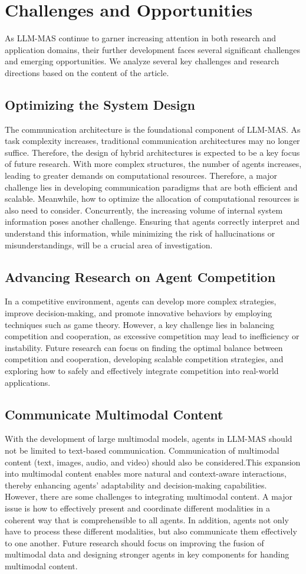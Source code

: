 \section{Challenges and Opportunities}
As LLM-MAS continue to garner increasing attention in both research and application domains, their further development faces several significant challenges and emerging opportunities. We analyze several key challenges and research directions based on the content of the article.
\subsection{Optimizing the System Design}
The communication architecture is the foundational component of LLM-MAS. As task complexity increases, traditional communication architectures may no longer suffice. Therefore, the design of hybrid architectures is expected to be a key focus of future research. With more complex structures, the number of agents increases, leading to greater demands on computational resources. Therefore, a major challenge lies in developing communication paradigms that are both efficient and scalable. Meanwhile, how to optimize the allocation of computational resources is also need to consider. Concurrently, the increasing volume of internal system information poses another challenge. Ensuring that agents correctly interpret and understand this information, while minimizing the risk of hallucinations or misunderstandings, will be a crucial area of investigation.
\subsection{Advancing Research on Agent Competition}
In a competitive environment, agents can develop more complex strategies, improve decision-making, and promote innovative behaviors by employing techniques such as game theory. However, a key challenge lies in balancing competition and cooperation, as excessive competition may lead to inefficiency or instability. Future research can focus on finding the optimal balance between competition and cooperation, developing scalable competition strategies, and exploring how to safely and effectively integrate competition into real-world applications.
\subsection{Communicate Multimodal Content}
With the development of large multimodal models, agents in LLM-MAS should not be limited to text-based communication. Communication of multimodal content (text, images, audio, and video) should also be considered.This expansion into multimodal content enables more natural and context-aware interactions, thereby enhancing agents' adaptability and decision-making capabilities. However, there are some challenges to integrating multimodal content. A major issue is how to effectively present and coordinate different modalities in a coherent way that is comprehensible to all agents. In addition, agents not only have to process these different modalities, but also communicate them effectively to one another. Future research should focus on improving the fusion of multimodal data and designing stronger agents in key components for handing multimodal content. 
